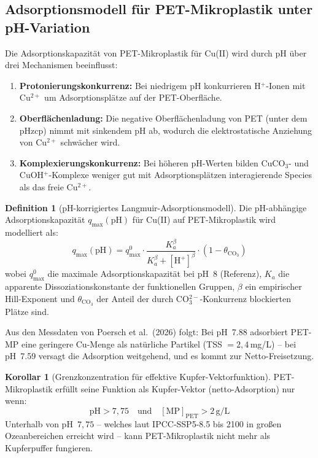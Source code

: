 ﻿\documentclass[12pt,a4paper]{article}
\theoremstyle{definition}
\newtheorem{definition}{Definition}[section]
\newtheorem{korollar}{Korollar}[section]
\theoremstyle{remark}
\begin{document}
\subsection{Adsorptionsmodell für PET-Mikroplastik unter pH-Variation}
\label{subsec:adsorption_model}

Die Adsorptionskapazit\"at von PET-Mikroplastik f\"ur Cu(II) wird durch pH
\"uber drei Mechanismen beeinflusst:
\begin{enumerate}[leftmargin=*]
  \item \textbf{Protonierungskonkurrenz:} Bei niedrigem pH konkurrieren H$^+$-Ionen
    mit Cu$^{2+}$ um Adsorptionspl\"atze auf der PET-Oberfläche.
  \item \textbf{Oberfl\"achenladung:} Die negative Oberfl\"achenladung von PET
    (unter dem pHzcp) nimmt mit sinkendem pH ab, wodurch die elektrostatische
    Anziehung von Cu$^{2+}$ schw\"acher wird.
  \item \textbf{Komplexierungskonkurrenz:} Bei h\"oheren pH-Werten bilden
    CuCO$_3$- und CuOH$^+$-Komplexe weniger gut mit Adsorptionspl\"atzen interagierende
    Species als das freie Cu$^{2+}$.
\end{enumerate}

\begin{definition}[pH-korrigiertes Langmuir-Adsorptionsmodell]
Die pH-abh\"angige Adsorptionskapazit\"at $q_{\max}(\text{pH})$ für Cu(II)
auf PET-Mikroplastik wird modelliert als:
\begin{equation}
  q_{\max}(\text{pH}) = q_{\max}^0 \cdot
  \frac{K_a^\beta}{K_a^\beta + [\text{H}^+]^\beta}
  \cdot (1 - \theta_{\text{CO}_3})
  \label{eq:langmuir_ph}
\end{equation}
wobei $q_{\max}^0$ die maximale Adsorptionskapazit\"at bei pH~8 (Referenz),
$K_a$ die apparente Dissoziationskonstante der funktionellen Gruppen,
$\beta$ ein empirischer Hill-Exponent und $\theta_{\text{CO}_3}$
der Anteil der durch CO$_3^{2-}$-Konkurrenz blockierten Plätze sind.
\end{definition}

Aus den Messdaten von Poersch et al.\ (2026) folgt: Bei pH~7.88 adsorbiert PET-MP
eine geringere Cu-Menge als nat\"urliche Partikel (TSS $= 2{,}4$\,mg/L) --
bei pH~7.59 versagt die Adsorption weitgehend, und es kommt zur Netto-Freisetzung.

\begin{korollar}[Grenzkonzentration für effektive Kupfer-Vektorfunktion]
PET-Mikroplastik erf\"ullt seine Funktion als Kupfer-Vektor (netto-Adsorption)
nur wenn:
\begin{equation}
  \text{pH} > 7{,}75 \quad \text{und} \quad
  [\text{MP}]_{\text{PET}} > 2\,\text{g/L}
  \label{eq:mp_vector_condition}
\end{equation}
Unterhalb von pH~$7{,}75$ -- welches laut IPCC-SSP5-8.5 bis 2100 in großen
Ozeanbereichen erreicht wird -- kann PET-Mikroplastik nicht mehr als
Kupferpuffer fungieren.
\end{korollar}
\end{document}
